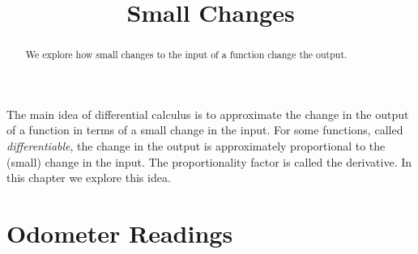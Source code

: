 \documentclass{ximera}
\title{Small Changes}
\begin{document}
\begin{abstract}
We explore how small changes to the input of a function change the output.
\end{abstract}
\maketitle

The main idea of differential calculus is to approximate the change in the output of a function in terms of a small change in the input. For some functions, called \emph{differentiable}, the change in the output is approximately proportional to the (small) change in the input. The proportionality factor is called the derivative. In this chapter we explore this idea.


\section{Odometer Readings}
\end{document}
